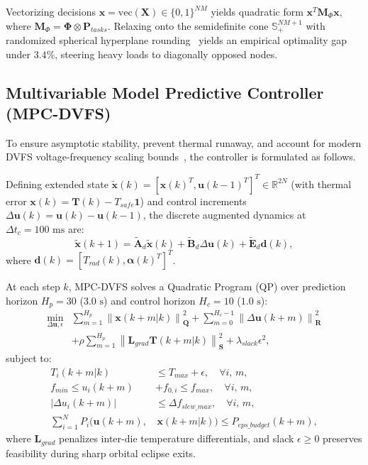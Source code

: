 \documentclass[journal]{IEEEtran}
\begin{document}
Vectorizing decisions $\mathbf{x} = \text{vec}(\mathbf{X}) \in \{0, 1\}^{NM}$ yields quadratic form $\mathbf{x}^T \mathbf{M}_{\Phi} \mathbf{x}$, where $\mathbf{M}_{\Phi} = \mathbf{\Phi} \otimes \mathbf{P}_{tasks}$. Relaxing onto the semidefinite cone $\mathbb{S}_+^{NM+1}$ with randomized spherical hyperplane rounding~\cite{boyd2004convex} yields an empirical optimality gap under $3.4\%$, steering heavy loads to diagonally opposed nodes.

\subsection{Multivariable Model Predictive Controller (MPC-DVFS)}
To ensure asymptotic stability, prevent thermal runaway, and account for modern DVFS voltage-frequency scaling bounds~\cite{lesueur2010dvfs, murali2007convex, yuan2025heat, hoffmann2021online}, the controller is formulated as follows.

Defining extended state $\tilde{\mathbf{x}}(k) = [\mathbf{x}(k)^T, \mathbf{u}(k-1)^T]^T \in \mathbb{R}^{2N}$ (with thermal error $\mathbf{x}(k) = \mathbf{T}(k) - T_{safe} \mathbf{1}$) and control increments $\Delta \mathbf{u}(k) = \mathbf{u}(k) - \mathbf{u}(k-1)$, the discrete augmented dynamics at $\Delta t_c = 100\text{ ms}$ are:
\begin{equation}
\tilde{\mathbf{x}}(k+1) = \tilde{\mathbf{A}}_d \tilde{\mathbf{x}}(k) + \tilde{\mathbf{B}}_d \Delta \mathbf{u}(k) + \tilde{\mathbf{E}}_d \mathbf{d}(k),
\end{equation}
where $\mathbf{d}(k) = [T_{rad}(k), \mathbf{\alpha}(k)^T]^T$.

At each step $k$, MPC-DVFS solves a Quadratic Program (QP) over prediction horizon $H_p = 30$ ($3.0\text{ s}$) and control horizon $H_c = 10$ ($1.0\text{ s}$):
\begin{align}
\min_{\Delta \mathbf{u}, \epsilon} & \sum_{m=1}^{H_p} \left\| \mathbf{x}(k+m|k) \right\|_{\mathbf{Q}}^2 + \sum_{m=0}^{H_c-1} \left\| \Delta \mathbf{u}(k+m) \right\|_{\mathbf{R}}^2 \nonumber \\
& + \rho \sum_{m=1}^{H_p} \left\| \mathbf{L}_{grad} \mathbf{T}(k+m|k) \right\|_{\mathbf{S}}^2 + \lambda_{slack} \epsilon^2,
\end{align}
subject to:
\begin{align}
T_i(k+m|k) &\le T_{max} + \epsilon, \quad \forall i, \, m, \\
f_{min} \le u_i(k+m) &+ f_{0, i} \le f_{max}, \quad \forall i, \, m, \\
|\Delta u_i(k+m)| &\le \Delta f_{slew\_max}, \quad \forall i, \, m, \\
\sum_{i=1}^N P_i(\mathbf{u}(k+m), &\, \mathbf{x}(k+m|k)) \le P_{eps\_budget}(k+m),
\end{align}
where $\mathbf{L}_{grad}$ penalizes inter-die temperature differentials, and slack $\epsilon \ge 0$ preserves feasibility during sharp orbital eclipse exits.
\end{document}
